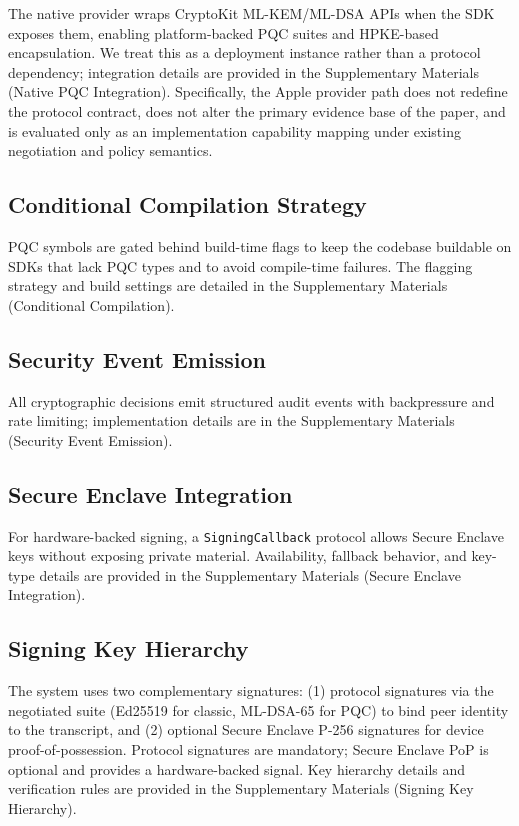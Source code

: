 \documentclass[10pt,journal,compsoc]{IEEEtran}
\begin{document}
The native provider wraps CryptoKit ML-KEM/ML-DSA APIs \cite{ref1,ref34} when the
SDK exposes them, enabling platform-backed PQC suites and HPKE-based
encapsulation. We treat this as a deployment instance rather than a
protocol dependency; integration details are provided in the
Supplementary Materials (Native PQC Integration). Specifically, the
Apple provider path does not redefine the protocol contract, does not
alter the primary evidence base of the paper, and is evaluated only as
an implementation capability mapping under existing negotiation and
policy semantics.

\subsection{Conditional Compilation
Strategy}\label{c.-conditional-compilation-strategy}

PQC symbols are gated behind build-time flags to keep the codebase
buildable on SDKs that lack PQC types and to avoid compile-time
failures. The flagging strategy and build settings are detailed in the
Supplementary Materials (Conditional Compilation).

\subsection{Security Event
Emission}\label{d.-security-event-emission}

All cryptographic decisions emit structured audit events with
backpressure and rate limiting; implementation details are in the
Supplementary Materials (Security Event Emission).

\subsection{Secure Enclave
Integration}\label{e.-secure-enclave-integration}

For hardware-backed signing, a \texttt{SigningCallback} protocol allows
Secure Enclave keys without exposing private material. Availability,
fallback behavior, and key-type details are provided in the
Supplementary Materials (Secure Enclave Integration).

\subsection{Signing Key Hierarchy}\label{f.-signing-key-hierarchy}

The system uses two complementary signatures: (1) protocol signatures
via the negotiated suite (Ed25519 for classic, ML-DSA-65 for PQC) to bind
peer identity to the transcript, and (2) optional Secure Enclave
P-256 signatures for device proof-of-possession. Protocol signatures are
mandatory; Secure Enclave PoP is optional and provides a hardware-backed
signal. Key hierarchy details and verification rules are provided in the
Supplementary Materials (Signing Key Hierarchy).
\end{document}
